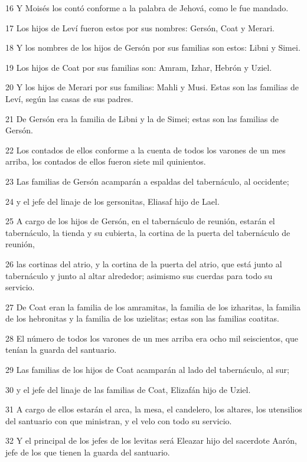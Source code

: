 \par 16 Y Moisés los contó conforme a la palabra de Jehová, como le fue mandado.
\par 17 Los hijos de Leví fueron estos por sus nombres: Gersón, Coat y Merari.
\par 18 Y los nombres de los hijos de Gersón por sus familias son estos: Libni y Simei.
\par 19 Los hijos de Coat por sus familias son: Amram, Izhar, Hebrón y Uziel.
\par 20 Y los hijos de Merari por sus familias: Mahli y Musi. Estas son las familias de Leví, según las casas de sus padres.
\par 21 De Gersón era la familia de Libni y la de Simei; estas son las familias de Gersón.
\par 22 Los contados de ellos conforme a la cuenta de todos los varones de un mes arriba, los contados de ellos fueron siete mil quinientos.
\par 23 Las familias de Gersón acamparán a espaldas del tabernáculo, al occidente;
\par 24 y el jefe del linaje de los gersonitas, Eliasaf hijo de Lael.
\par 25 A cargo de los hijos de Gersón, en el tabernáculo de reunión, estarán el tabernáculo, la tienda y su cubierta, la cortina de la puerta del tabernáculo de reunión,
\par 26 las cortinas del atrio, y la cortina de la puerta del atrio, que está junto al tabernáculo y junto al altar alrededor; asimismo sus cuerdas para todo su servicio.
\par 27 De Coat eran la familia de los amramitas, la familia de los izharitas, la familia de los hebronitas y la familia de los uzielitas; estas son las familias coatitas.
\par 28 El número de todos los varones de un mes arriba era ocho mil seiscientos, que tenían la guarda del santuario.
\par 29 Las familias de los hijos de Coat acamparán al lado del tabernáculo, al sur;
\par 30 y el jefe del linaje de las familias de Coat, Elizafán hijo de Uziel.
\par 31 A cargo de ellos estarán el arca, la mesa, el candelero, los altares, los utensilios del santuario con que ministran, y el velo con todo su servicio.
\par 32 Y el principal de los jefes de los levitas será Eleazar hijo del sacerdote Aarón, jefe de los que tienen la guarda del santuario.
